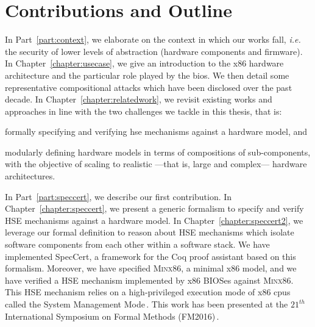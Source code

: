 \section{Contributions and Outline}


In Part~\ref{part:context}, we elaborate on the context in which our works fall, \emph{i.e.} the security of lower levels of abstraction (hardware components and firmware).
%
In Chapter~\ref{chapter:usecase}, we give an introduction to the x86 hardware
architecture and the particular role played by the \ac{bios}.
%
We then detail some representative compositional attacks which have
been disclosed over the past decade.
%
%
In Chapter~\ref{chapter:relatedwork}, we revisit existing works  and approaches
in line with the two challenges we tackle in this thesis, that is:
%
\begin{inparaenum}[(1)]
\item formally specifying and verifying \ac{hse} mechanisms against a hardware
  model, and
%
\item modularly defining hardware models in terms of compositions of
  sub-components, with the objective of scaling to realistic ---that is, large
  and complex--- hardware architectures.
\end{inparaenum}

In Part~\ref{part:speccert}, we describe our first contribution.
%
In Chapter~\ref{chapter:speccert}, we present a generic formalism to specify and
verify HSE mechanisms against a hardware model.
%
In Chapter~\ref{chapter:speccert2}, we leverage our formal definition to reason
about HSE mechanisms which isolate software components from each other within a
software stack.
%
We have implemented SpecCert, a framework for the Coq proof assistant based on
this formalism.
%
Moreover, we have specified {\scshape Minx86}, a minimal x86 model, and we
have verified a HSE mechanism implemented by x86 BIOSes against {\scshape
  Minx86}.
%
This HSE mechanism relies on a high-privileged execution mode of x86 \acp{cpu}
called the System Management Mode\,\cite{intel2014manual}.
%
This work has been presented at the $21^{th}$ International Symposium on Formal
Methods (FM2016)\,\cite{letan2016speccert}.

